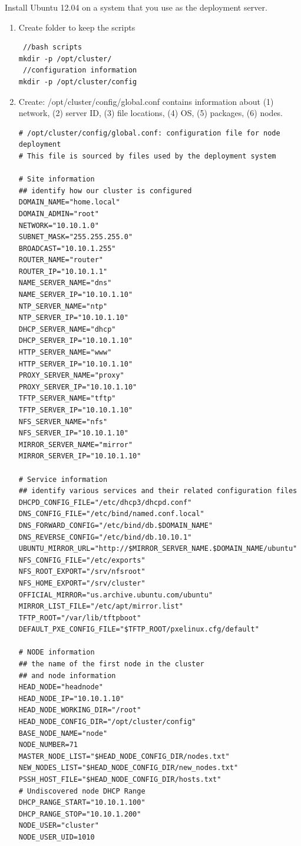 Install Ubuntu 12.04 on a system that you use as the deployment server.
\begin{enumerate}
  \item Create folder to keep the scripts
\begin{verbatim}
 //bash scripts
mkdir -p /opt/cluster/
 //configuration information
mkdir -p /opt/cluster/config
\end{verbatim}

  \item Create: /opt/cluster/config/global.conf contains information about
  (1) network, (2) server ID, (3) file locations, (4) OS, (5) packages, (6) nodes.
\begin{verbatim}
# /opt/cluster/config/global.conf: configuration file for node deployment 
# This file is sourced by files used by the deployment system 

# Site information 
## identify how our cluster is configured
DOMAIN_NAME="home.local" 
DOMAIN_ADMIN="root" 
NETWORK="10.10.1.0" 
SUBNET_MASK="255.255.255.0" 
BROADCAST="10.10.1.255" 
ROUTER_NAME="router" 
ROUTER_IP="10.10.1.1" 
NAME_SERVER_NAME="dns" 
NAME_SERVER_IP="10.10.1.10" 
NTP_SERVER_NAME="ntp" 
NTP_SERVER_IP="10.10.1.10" 
DHCP_SERVER_NAME="dhcp" 
DHCP_SERVER_IP="10.10.1.10" 
HTTP_SERVER_NAME="www" 
HTTP_SERVER_IP="10.10.1.10" 
PROXY_SERVER_NAME="proxy" 
PROXY_SERVER_IP="10.10.1.10" 
TFTP_SERVER_NAME="tftp" 
TFTP_SERVER_IP="10.10.1.10" 
NFS_SERVER_NAME="nfs" 
NFS_SERVER_IP="10.10.1.10" 
MIRROR_SERVER_NAME="mirror" 
MIRROR_SERVER_IP="10.10.1.10" 

# Service information 
## identify various services and their related configuration files
DHCPD_CONFIG_FILE="/etc/dhcp3/dhcpd.conf" 
DNS_CONFIG_FILE="/etc/bind/named.conf.local" 
DNS_FORWARD_CONFIG="/etc/bind/db.$DOMAIN_NAME" 
DNS_REVERSE_CONFIG="/etc/bind/db.10.10.1" 
UBUNTU_MIRROR_URL="http://$MIRROR_SERVER_NAME.$DOMAIN_NAME/ubuntu" 
NFS_CONFIG_FILE="/etc/exports" 
NFS_ROOT_EXPORT="/srv/nfsroot" 
NFS_HOME_EXPORT="/srv/cluster" 
OFFICIAL_MIRROR="us.archive.ubuntu.com/ubuntu" 
MIRROR_LIST_FILE="/etc/apt/mirror.list" 
TFTP_ROOT="/var/lib/tftpboot" 
DEFAULT_PXE_CONFIG_FILE="$TFTP_ROOT/pxelinux.cfg/default" 

# NODE information 
## the name of the first node in the cluster
## and node information
HEAD_NODE="headnode" 
HEAD_NODE_IP="10.10.1.10" 
HEAD_NODE_WORKING_DIR="/root" 
HEAD_NODE_CONFIG_DIR="/opt/cluster/config" 
BASE_NODE_NAME="node" 
NODE_NUMBER=71 
MASTER_NODE_LIST="$HEAD_NODE_CONFIG_DIR/nodes.txt" 
NEW_NODES_LIST="$HEAD_NODE_CONFIG_DIR/new_nodes.txt" 
PSSH_HOST_FILE="$HEAD_NODE_CONFIG_DIR/hosts.txt" 
# Undiscovered node DHCP Range 
DHCP_RANGE_START="10.10.1.100" 
DHCP_RANGE_STOP="10.10.1.200" 
NODE_USER="cluster" 
NODE_USER_UID=1010 


\end{verbatim}
\end{enumerate}

